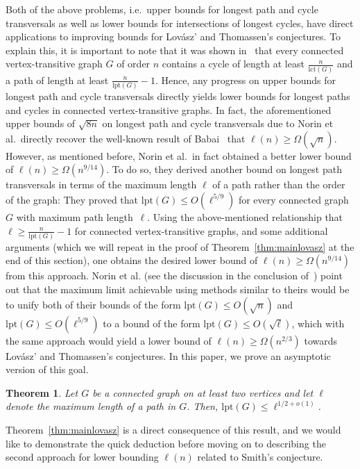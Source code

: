 \documentclass[11pt,reqno]{article}
\newtheorem{theorem}{Theorem}[section]
\begin{document}
Both of the above problems, i.e.\ upper bounds for longest path and cycle transversals as well as lower bounds for intersections of longest cycles, have direct applications to improving bounds for Lov\'{a}sz' and Thomassen's conjectures. To explain this, it is important to note that it was shown in~\cite[Proposition 5.1]{groen} that every connected vertex-transitive graph $G$ of order $n$ contains a cycle of length at least $\frac{n}{\mathrm{lct}(G)}$ and a path of length at least $\frac{n}{\mathrm{lpt}(G)}-1$. Hence, any progress on upper bounds for longest path and cycle transversals directly yields lower bounds for longest paths and cycles in connected vertex-transitive graphs. In fact, the aforementioned upper bounds of $\sqrt{8n}$ on longest path and cycle transversals due to Norin et al.~directly recover the well-known result of Babai~\cite{babai} that $\ell(n)\ge \Omega(\sqrt{n})$. However, as mentioned before, Norin et al.~in fact obtained a better lower bound of $\ell(n)\ge \Omega(n^{9/14})$. To do so, they derived another bound on longest path transversals in terms of the maximum length $\ell$ of a path rather than the order of the graph: They proved that $\mathrm{lpt}(G)\le O(\ell^{5/9})$ for every connected graph $G$ with maximum path length~$\ell$. Using the above-mentioned relationship that $\ell\ge \frac{n}{\mathrm{lpt}(G)}-1$ for connected vertex-transitive graphs, and some additional arguments (which we will repeat in the proof of Theorem~\ref{thm:mainlovasz} at the end of this section), one obtains the desired lower bound of $\ell(n)\ge \Omega(n^{9/14})$ from this approach. Norin et al. (see the discussion in the conclusion of~\cite{norin}) point out that the maximum limit achievable using methods similar to theirs would be to unify both of their bounds of the form $\mathrm{lpt}(G)\le O(\sqrt{n})$ and $\mathrm{lpt}(G)\le O(\ell^{5/9})$ to a bound of the form $\mathrm{lpt}(G)\le O(\sqrt{\ell})$, which with the same approach would yield a lower bound of $\ell(n)\ge \Omega(n^{2/3})$ towards Lov\'{a}sz' and Thomassen's conjectures. In this paper, we prove an asymptotic version of this goal. 

\begin{theorem}\label{thm:smallhittingset}
Let $G$ be a connected graph on at least two vertices and let $\ell$ denote the maximum length of a path in $G$. Then, $\mathrm{lpt}(G)\le \ell^{1/2+o(1)}$. 
\end{theorem}

Theorem~\ref{thm:mainlovasz} is a direct consequence of this result, and we would like to demonstrate the quick deduction before moving on to describing the second approach for lower bounding $\ell(n)$ related to Smith's conjecture.
\end{document}
